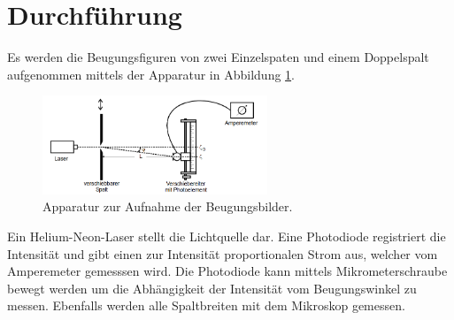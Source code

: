 \section{Durchführung}
\label{sec:Durchführung}
Es werden die Beugungsfiguren von zwei Einzelspaten und einem Doppelspalt aufgenommen mittels der Apparatur
in Abbildung \ref{fig:aufbau}.
\FloatBarrier
\begin{figure}
 \centering
 \includegraphics[width=0.6\textwidth]{aufbau.PNG}
 \caption{Apparatur zur Aufnahme der Beugungsbilder.\cite{sample}}
 \label{fig:aufbau}
\end{figure}
\FloatBarrier
Ein Helium-Neon-Laser stellt die Lichtquelle dar. Eine Photodiode registriert die Intensität und
gibt einen zur Intensität proportionalen Strom aus, welcher vom Amperemeter gemesssen wird.
Die Photodiode kann mittels Mikrometerschraube bewegt werden um die Abhängigkeit der Intensität vom Beugungswinkel
zu messen.
Ebenfalls werden alle Spaltbreiten mit dem Mikroskop gemessen.
